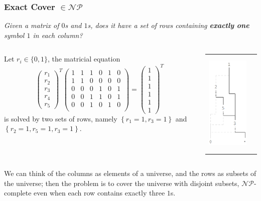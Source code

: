 \documentclass[10pt]{beamer}
\begin{document}
\begin{frame}[fragile]
\frametitle{Exact Cover $\in \mathcal{NP}$}
\emph{Given a matrix of $0$s and $1$s, does it have a set of rows containing \textbf{exactly one} symbol $1$ in each column?}
\begin{columns}
     \begin{column}{.7\linewidth}
      Let $r_{i}\in\lbrace 0, 1 \rbrace$, the matricial equation
      \begin{displaymath}
        \left(\begin{array}{c}
          r_{1} \\ r_{2} \\ r_{3} \\ r_{4} \\ r_{5}
        \end{array}\right)^{T}
        \left(\begin{array}{cccccc}
          1 & 1 & 1 & 0 & 1 & 0 \\
          1 & 1 & 0 & 0 & 0 & 0 \\
          0 & 0 & 0 & 1 & 0 & 1 \\
          0 & 0 & 1 & 1 & 0 & 1 \\
          0 & 0 & 1 & 0 & 1 & 0 \\
        \end{array}\right) = 
        \left(\begin{array}{c}
          1 \\ 1 \\ 1 \\ 1 \\ 1 \\ 1
        \end{array}\right)^{T}
      \end{displaymath}
      is solved by two sets of rows, namely 
      $\left\lbrace r_{1}=1, r_{3}=1\right\rbrace$ and
      $\left\lbrace r_{2}=1, r_{5}=1, r_{3}=1\right\rbrace$.
     \end{column}
     \begin{column}{.3\linewidth}
       \begin{tabular}{cc}
          \includegraphics[width=3cm,height=5cm]{ZDD.png}
       \end{tabular}
     \end{column}
   \end{columns}
We can think of the columns as elements of a universe, and the rows as subsets of the universe; 
then the problem is to cover the universe with disjoint subsets, $\mathcal{NP}$-complete even 
when each row contains exactly three $1$s.
\end{frame}
\end{document}
